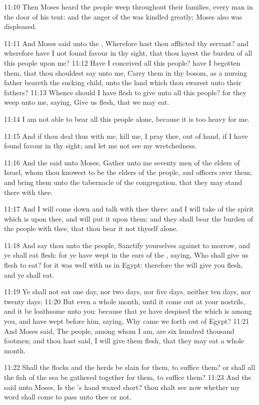11:10 Then Moses heard the people weep throughout their families,
every man in the door of his tent: and the anger of the \LORD was
kindled greatly; Moses also was displeased.

11:11 And Moses said unto the \LORD, Wherefore hast thou afflicted thy
servant? and wherefore have I not found favour in thy sight, that thou
layest the burden of all this people upon me?  11:12 Have I conceived
all this people? have I begotten them, that thou shouldest say unto
me, Carry them in thy bosom, as a nursing father beareth the sucking
child, unto the land which thou swarest unto their fathers?  11:13
Whence should I have flesh to give unto all this people? for they weep
unto me, saying, Give us flesh, that we may eat.

11:14 I am not able to bear all this people alone, because it is too
heavy for me.

11:15 And if thou deal thus with me, kill me, I pray thee, out of
hand, if I have found favour in thy sight; and let me not see my
wretchedness.

11:16 And the \LORD said unto Moses, Gather unto me seventy men of the
elders of Israel, whom thou knowest to be the elders of the people,
and officers over them; and bring them unto the tabernacle of the
congregation, that they may stand there with thee.

11:17 And I will come down and talk with thee there: and I will take
of the spirit which is upon thee, and will put it upon them; and they
shall bear the burden of the people with thee, that thou bear it not
thyself alone.

11:18 And say thou unto the people, Sanctify yourselves against to
morrow, and ye shall eat flesh: for ye have wept in the ears of the
\LORD, saying, Who shall give us flesh to eat? for it was well with us
in Egypt: therefore the \LORD will give you flesh, and ye shall eat.

11:19 Ye shall not eat one day, nor two days, nor five days, neither
ten days, nor twenty days; 11:20 But even a whole month, until it come
out at your nostrils, and it be loathsome unto you: because that ye
have despised the \LORD which is among you, and have wept before him,
saying, Why came we forth out of Egypt?  11:21 And Moses said, The
people, among whom I am, are six hundred thousand footmen; and thou
hast said, I will give them flesh, that they may eat a whole month.

11:22 Shall the flocks and the herds be slain for them, to suffice
them?  or shall all the fish of the sea be gathered together for them,
to suffice them?  11:23 And the \LORD said unto Moses, Is the \LORD's
hand waxed short? thou shalt see now whether my word shall come to
pass unto thee or not.

